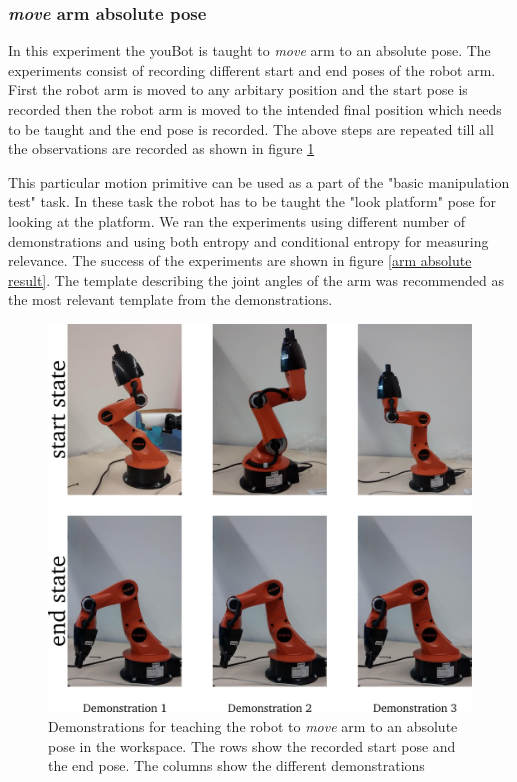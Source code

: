 \FloatBarrier
\subsubsection{\textit{move} arm absolute pose}
In this experiment the youBot is
taught to \textit{move} arm to an absolute pose.
The experiments consist of recording different start and end poses of the robot arm. 
First the robot arm is moved to any arbitary position and the start pose is recorded then 
the robot arm is moved to the intended final position which needs to be taught and the end 
pose is recorded. The above steps are repeated till all the observations are recorded as shown in figure \ref{arm absolute exp}


This particular motion primitive can be used as a part of the "basic manipulation test" task. In these
task the robot has to be taught the "look platform" pose for looking at the platform.
We ran the experiments using different number of demonstrations and using both entropy 
and conditional entropy for measuring relevance. The success of the experiments are 
shown in figure \ref{arm absolute result}. 
The template describing the joint angles of the arm was recommended as the most
relevant template from the demonstrations.
\begin{figure}[htp]
\centering
\includegraphics[scale=0.6]{images/arm_absolute_exp.png}
\caption[Demonstrations to teach the robot to move arm to an absolute location ]
{Demonstrations for teaching the robot to \textit{move} arm
to an absolute pose in the workspace. The rows show the recorded start pose and the end pose. The 
columns show the different demonstrations}
\label{arm absolute exp}
\end{figure}

